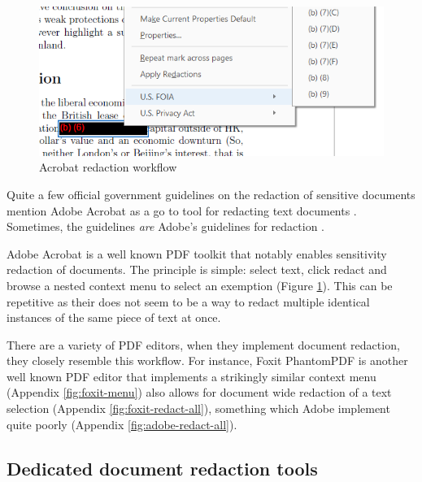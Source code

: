 \documentclass{l4proj}
\begin{document}
\begin{figure}
    \includegraphics[width=\linewidth]{images/related_products/adobe_redaction.png}
    \caption{Acrobat redaction workflow}
    \vspace{-20pt}
    \label{fig:adobe-redaction}
\end{figure}

Quite a few official government guidelines on the redaction of sensitive documents mention Adobe Acrobat as a go to tool for redacting text documents \autocite{thenationalarchivesRedactionToolkitPaper2016}.
Sometimes, the guidelines \textit{are} Adobe's guidelines for redaction \autocite{scottishgovernmentRedactingInformation2019}.

Adobe Acrobat is a well known PDF toolkit that notably enables sensitivity redaction of documents.
The principle is simple: select text, click redact and browse a nested context menu to select an exemption (Figure \ref{fig:adobe-redaction}).
This can be repetitive as their does not seem to be a way to redact multiple identical instances of the same piece of text at once.

There are a variety of PDF editors, when they implement document redaction, they closely resemble this workflow.
For instance, Foxit PhantomPDF is another well known PDF editor that implements a strikingly similar context menu (Appendix \ref{fig:foxit-menu}) also allows for document wide redaction of a text selection (Appendix \ref{fig:foxit-redact-all}), something which Adobe implement quite poorly (Appendix \ref{fig:adobe-redact-all}).

\subsection{Dedicated document redaction tools}
\end{document}
